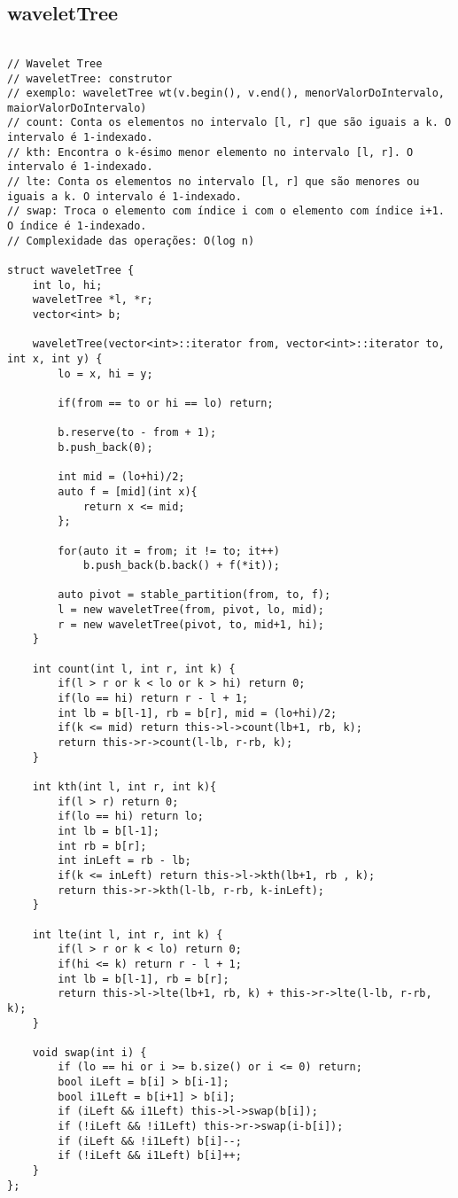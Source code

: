\documentclass[landscape,twocolumn,10pt,a4paper]{article}
\begin{document}
\subsection{waveletTree}
\begin{verbatim}

// Wavelet Tree
// waveletTree: construtor
// exemplo: waveletTree wt(v.begin(), v.end(), menorValorDoIntervalo, maiorValorDoIntervalo)
// count: Conta os elementos no intervalo [l, r] que são iguais a k. O intervalo é 1-indexado.
// kth: Encontra o k-ésimo menor elemento no intervalo [l, r]. O intervalo é 1-indexado.
// lte: Conta os elementos no intervalo [l, r] que são menores ou iguais a k. O intervalo é 1-indexado.
// swap: Troca o elemento com índice i com o elemento com índice i+1. O índice é 1-indexado.
// Complexidade das operações: O(log n)

struct waveletTree {
    int lo, hi;
    waveletTree *l, *r;
    vector<int> b;

    waveletTree(vector<int>::iterator from, vector<int>::iterator to, int x, int y) {
        lo = x, hi = y;

        if(from == to or hi == lo) return;

        b.reserve(to - from + 1);
        b.push_back(0);

        int mid = (lo+hi)/2;
        auto f = [mid](int x){
			return x <= mid;
		};

        for(auto it = from; it != to; it++)
			b.push_back(b.back() + f(*it));

        auto pivot = stable_partition(from, to, f);
		l = new waveletTree(from, pivot, lo, mid);
		r = new waveletTree(pivot, to, mid+1, hi);
    }

	int count(int l, int r, int k) {
		if(l > r or k < lo or k > hi) return 0;
		if(lo == hi) return r - l + 1;
		int lb = b[l-1], rb = b[r], mid = (lo+hi)/2;
		if(k <= mid) return this->l->count(lb+1, rb, k);
		return this->r->count(l-lb, r-rb, k);
	}

	int kth(int l, int r, int k){
		if(l > r) return 0;
		if(lo == hi) return lo;
		int lb = b[l-1];
		int rb = b[r];
		int inLeft = rb - lb;
		if(k <= inLeft) return this->l->kth(lb+1, rb , k);
		return this->r->kth(l-lb, r-rb, k-inLeft);
	}

	int lte(int l, int r, int k) {
		if(l > r or k < lo) return 0;
		if(hi <= k) return r - l + 1;
		int lb = b[l-1], rb = b[r];
		return this->l->lte(lb+1, rb, k) + this->r->lte(l-lb, r-rb, k);
	}

    void swap(int i) {
        if (lo == hi or i >= b.size() or i <= 0) return;
        bool iLeft = b[i] > b[i-1];
        bool i1Left = b[i+1] > b[i];
        if (iLeft && i1Left) this->l->swap(b[i]);
        if (!iLeft && !i1Left) this->r->swap(i-b[i]);
        if (iLeft && !i1Left) b[i]--;
        if (!iLeft && i1Left) b[i]++;
    }
};

\end{verbatim}
\end{document}
